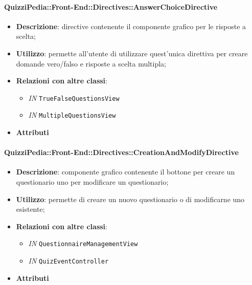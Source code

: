 \paragraph{QuizziPedia::Front-End::Directives::AnswerChoiceDirective}
\begin{itemize}
	\item \textbf{Descrizione}: directive contenente il componente grafico per le risposte a scelta;
	\item \textbf{Utilizzo}: permette all'utente di utilizzare quest'unica direttiva per creare domande vero/falso e risposte a scelta multipla;
	\item \textbf{Relazioni con altre classi}:
	\begin{itemize}
		\item \textit{IN} \texttt{TrueFalseQuestionsView} \\
		\item \textit{IN} \texttt{MultipleQuestionsView} \\
	\end{itemize}
	\item \textbf{Attributi}
\end{itemize}

\paragraph{QuizziPedia::Front-End::Directives::CreationAndModifyDirective}
\begin{itemize}
	\item \textbf{Descrizione}: componente grafico contenente il bottone per creare un questionario uno per modificare un questionario;
	\item \textbf{Utilizzo}: permette di creare un nuovo questionario o di modificarne uno esistente;
	\item \textbf{Relazioni con altre classi}:
	\begin{itemize}
		\item \textit{IN} \texttt{QuestionnaireManagementView} \\
		\item \textit{IN} \texttt{QuizEventController} \\
	\end{itemize}
	\item \textbf{Attributi}
\end{itemize}

